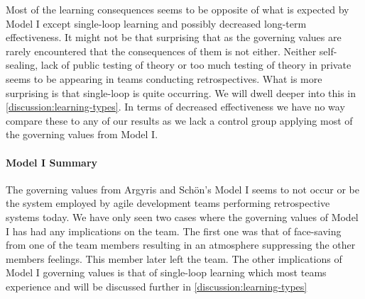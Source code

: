 Most of the learning consequences seems to be opposite of what is expected by Model I except single-loop learning and possibly decreased long-term effectiveness. It might not be that surprising that as the governing values are rarely encountered that the consequences of them is not either. Neither self-sealing, lack of public testing of theory or too much testing of theory in private seems to be appearing in teams conducting retrospectives. What is more surprising is that single-loop is quite occurring. We will dwell deeper into this in \autoref{discussion:learning-types}. In terms of decreased effectiveness we have no way compare these to any of our results as we lack a control group applying most of the governing values from Model I. 

\paragraph{Model I Summary}
The governing values from Argyris and Schön's Model I seems to not occur or be the system employed by agile development teams performing retrospective systems today. We have only seen two cases where the governing values of Model I has had any implications on the team. The first one was that of face-saving from one of the team members resulting in an atmosphere suppressing the other members feelings. This member later left the team. The other implications of Model I governing values is that of single-loop learning which most teams experience and will be discussed further in \autoref{discussion:learning-types}

